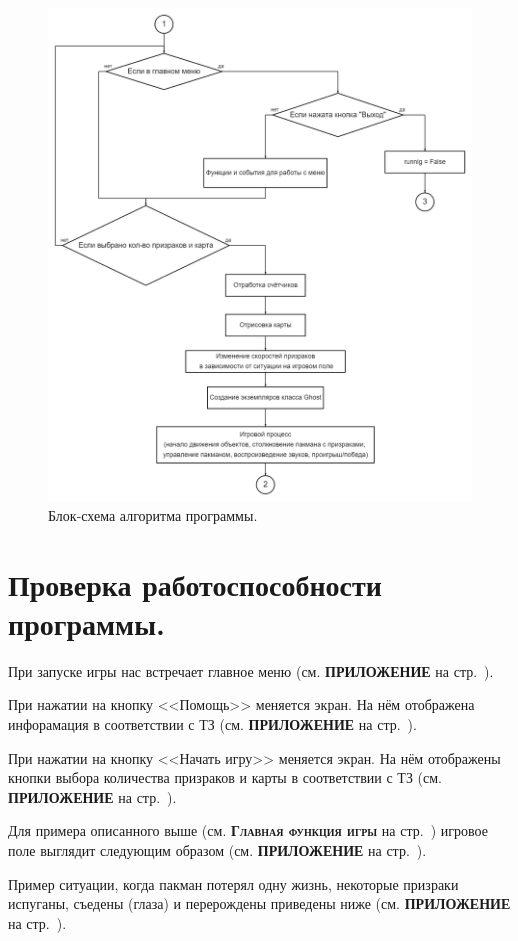 \begin{figure}[H]
	\centering
	\includegraphics[width=1\linewidth]{images/flow2.png}
	\caption{Блок-схема алгоритма программы.}
	\label{fig8}
\end{figure}

\section{\label{sec:ch02/sec02}Проверка работоспособности программы.}
При запуске игры нас встречает главное меню (см. \textbf{\textsc{ПРИЛОЖЕНИЕ}} на стр.~\pageref{fig2}).

При нажатии на кнопку <<Помощь>> меняется экран. На нём отображена инфорамация в соответствии с ТЗ (см. \textbf{\textsc{ПРИЛОЖЕНИЕ}} на стр.~\pageref{fig3}).

При нажатии на кнопку <<Начать игру>> меняется экран. На нём отображены кнопки выбора количества призраков и карты в соответствии с ТЗ (см. \textbf{\textsc{ПРИЛОЖЕНИЕ}} на стр.~\pageref{fig4}).

Для примера описанного выше (см. \textbf{\textsc{Главная функция игры}} на стр.~\pageref{subsec:ch02/sec01/sub07}) игровое поле выглядит следующим образом (см. \textbf{\textsc{ПРИЛОЖЕНИЕ}} на стр.~\pageref{fig5}).

Пример ситуации, когда пакман потерял одну жизнь, некоторые призраки испуганы, съедены (глаза) и перерождены приведены ниже (см. \textbf{\textsc{ПРИЛОЖЕНИЕ}} на стр.~\pageref{fig6}).